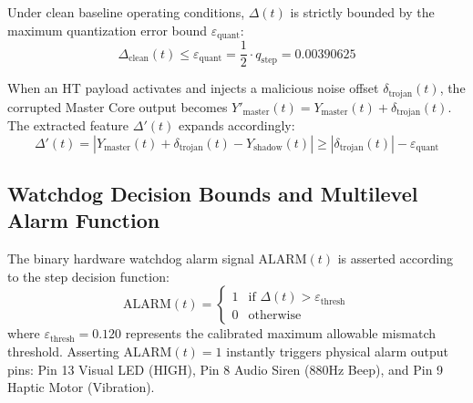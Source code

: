 \documentclass[conference]{IEEEtran}
\begin{document}
Under clean baseline operating conditions, $\Delta(t)$ is strictly bounded by the maximum quantization error bound $\varepsilon_{\text{quant}}$:
\begin{equation}
\Delta_{\text{clean}}(t) \le \varepsilon_{\text{quant}} = \frac{1}{2} \cdot q_{\text{step}} = 0.00390625
\end{equation}

When an HT payload activates and injects a malicious noise offset $\delta_{\text{trojan}}(t)$, the corrupted Master Core output becomes $Y'_{\text{master}}(t) = Y_{\text{master}}(t) + \delta_{\text{trojan}}(t)$. The extracted feature $\Delta'(t)$ expands accordingly:
\begin{equation}
\Delta'(t) = | Y_{\text{master}}(t) + \delta_{\text{trojan}}(t) - Y_{\text{shadow}}(t) | \ge | \delta_{\text{trojan}}(t) | - \varepsilon_{\text{quant}}
\end{equation}

\subsection{Watchdog Decision Bounds and Multilevel Alarm Function}
The binary hardware watchdog alarm signal $\text{ALARM}(t)$ is asserted according to the step decision function:
\begin{equation}
\text{ALARM}(t) = \begin{cases} 1 & \text{if } \Delta(t) > \varepsilon_{\text{thresh}} \\ 0 & \text{otherwise} \end{cases}
\end{equation}
where $\varepsilon_{\text{thresh}} = 0.120$ represents the calibrated maximum allowable mismatch threshold. Asserting $\text{ALARM}(t) = 1$ instantly triggers physical alarm output pins: Pin 13 Visual LED (HIGH), Pin 8 Audio Siren (880Hz Beep), and Pin 9 Haptic Motor (Vibration).
\end{document}
